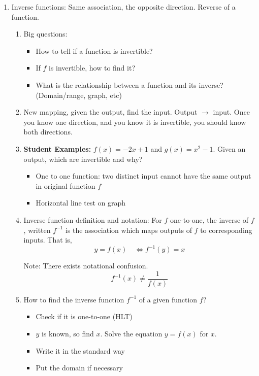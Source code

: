 \documentclass{article}
\begin{document}
\begin{enumerate}
\item Inverse functions: Same association, the opposite direction. Reverse of a function.
\begin{enumerate}

\item Big questions:
\begin{itemize}
\item How to tell if a function is invertible?
\item If $f$ is invertible, how to find it?
\item What is the relationship between a function and its inverse? (Domain/range, graph, etc)
\end{itemize}

\item New mapping, given the output, find the input. Output $\rightarrow $ input. Once you know one direction, and you know it is invertible, you should know both directions.

\item {\bf Student Examples:} $f(x) = -2x+1$ and $g(x)=x^2-1$. Given an output, which are invertible and why?
\begin{itemize}
\item One to one function: two distinct input cannot have the same output in original function $f$
\item Horizontal line test on graph
\end{itemize}

\item Inverse function definition and notation: For $f$ one-to-one, the inverse of $f$, written $f^{-1}$ is the association which maps outputs of $f$ to corresponding inputs. That is,
\[
y=f(x) \quad \Longleftrightarrow f^{-1}(y)=x
\]

Note: There exists notational confusion.
$$
f^{-1} (x) \neq \frac{1}{f(x)}
$$

\item How to find the inverse function $f^{-1}$ of a given function $f$?
\begin{itemize}
\item Check if it is one-to-one (HLT)
\item $y$ is known, so find $x$. Solve the equation $y=f(x)$ for $x$.
\item Write it in the standard way
\item Put the domain if necessary
\end{itemize}


\end{enumerate}
\end{enumerate}
\end{document}
